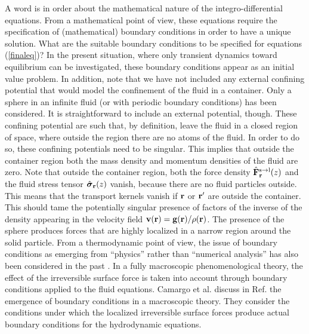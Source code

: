 \documentclass[b5paper,openright,10pt]{book}
\begin{document}
A   word  is   in  order   about  the   mathematical  nature   of  the
integro-differential equations.   From a  mathematical point  of view,
these equations  require the specification of  (mathematical) boundary
conditions in order  to have a unique solution. What  are the suitable
boundary conditions to be specified for equations  (\ref{finaleq})?  In the
present situation,  where only transient dynamics  toward equilibrium
can be  investigated, these boundary  conditions appear as  an initial
value  problem.  In  addition,  note  that we  have  not included  any
external confining potential that would model the  confinement of the fluid in a
container.   Only a  sphere in  an  infinite fluid  (or with  periodic
boundary conditions)  has been  considered.  It is  straightforward to
include an external potential,  though.  These confining potential are
such that, by definition, leave the fluid in a closed region of space,
where outside the region there are no atoms of the fluid.  In order to
do so, these  confining potentials need to be  singular.  This implies
that outside the  container region both the mass  density and momentum
densities of the fluid are zero.
Note that outside the  container region, both
the force density $\hat{\bf F}_{\bf  r}^{\rm s\to l}(z)$ and the fluid
stress tensor  $\hat{\boldsymbol{\sigma}}_{\bf r}(z)$  vanish, because
there are  no fluid particles  outside. This means that  the transport
kernels vanish if  ${\bf r}$ or ${\bf r}'$ are  outside the container.
This should tame  the potentially singular presence of  factors of the
inverse of the  density appearing in the velocity  field ${\bf v}({\bf
  r})={\bf  g}({\bf r})/\rho({\bf  r})$.  The  presence of  the sphere
produces forces  that are highly  localized in a narrow  region around
the solid particle.  From a thermodynamic  point of view, the issue of
boundary  conditions   as  emerging   from  ``physics''   rather  than
``numerical  analysis''   has  also   been  considered  in   the  past
\cite{Bedeaux1976,Qian2008,Ottinger2008,Sagis2011}.    In    a   fully
macroscopic phenomenological  theory, the  effect of  the irreversible
surface  force  is  taken  into account  through  boundary  conditions
applied  to  the fluid  equations.  Camargo et al. discuss in Ref. \cite{CamargoBC2018} 
the emergence  of  boundary conditions  in a  macroscopic
theory.  They  consider the  conditions  under  which  the
localized   irreversible  surface   forces  produce   actual  boundary
conditions for the hydrodynamic equations.
\end{document}
